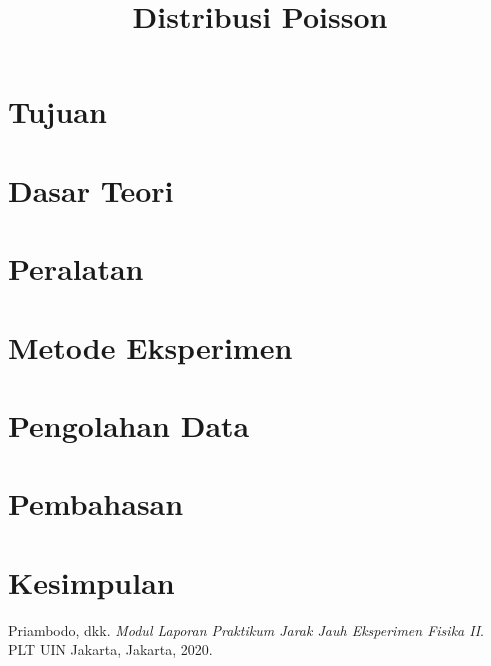 \documentclass{article}
\title{Distribusi Poisson}
\date{}
\author{}
\begin{document}
	\maketitle
	
	\section{Tujuan}
	
	\section{Dasar Teori}
	 
	\section{Peralatan}

	\section{Metode Eksperimen}

	\section{Pengolahan Data}
	
	\section{Pembahasan}

	\section{Kesimpulan}

	\begin{thebibliography}{9}
		Priambodo, dkk. 
		\textit{Modul Laporan Praktikum Jarak Jauh Eksperimen Fisika II}. 
		PLT UIN Jakarta, Jakarta, 2020.
	\end{thebibliography}
	
\end{document}
